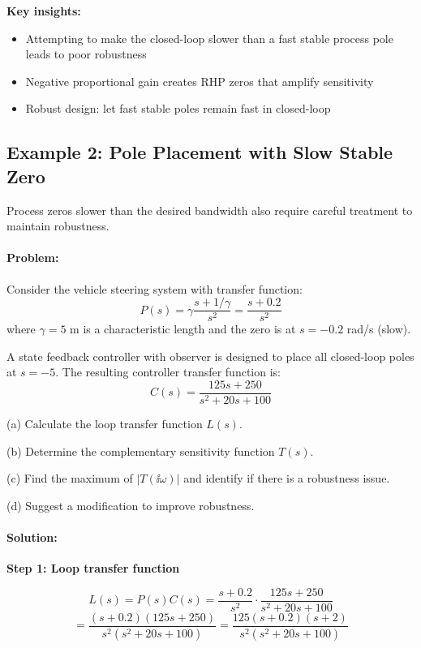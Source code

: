 \documentclass[11pt,a4paper]{article}
\begin{document}
\textbf{Key insights:}
\begin{itemize}
  \item Attempting to make the closed-loop slower than a fast stable process pole leads to poor robustness
  \item Negative proportional gain creates RHP zeros that amplify sensitivity
  \item Robust design: let fast stable poles remain fast in closed-loop
\end{itemize}

\subsection{Example 2: Pole Placement with Slow Stable Zero}

Process zeros slower than the desired bandwidth also require careful treatment to maintain robustness.

\paragraph{Problem:}
Consider the vehicle steering system with transfer function:
\begin{equation}
  P(s) = \gamma\frac{s + 1/\gamma}{s^2} = \frac{s + 0.2}{s^2}
\end{equation}
where $\gamma = 5$ m is a characteristic length and the zero is at $s = -0.2$ rad/s (slow).

A state feedback controller with observer is designed to place all closed-loop poles at $s = -5$. The resulting controller transfer function is:
\begin{equation}
  C(s) = \frac{125s + 250}{s^2 + 20s + 100}
\end{equation}

(a) Calculate the loop transfer function $L(s)$.

(b) Determine the complementary sensitivity function $T(s)$.

(c) Find the maximum of $|T(\ii\omega)|$ and identify if there is a robustness issue.

(d) Suggest a modification to improve robustness.

\paragraph{Solution:}

\textbf{Step 1: Loop transfer function}

\begin{equation}
  L(s) = P(s)C(s) = \frac{s + 0.2}{s^2} \cdot \frac{125s + 250}{s^2 + 20s + 100}
\end{equation}
\begin{equation}
  = \frac{(s + 0.2)(125s + 250)}{s^2(s^2 + 20s + 100)} = \frac{125(s + 0.2)(s + 2)}{s^2(s^2 + 20s + 100)}
\end{equation}
\end{document}

